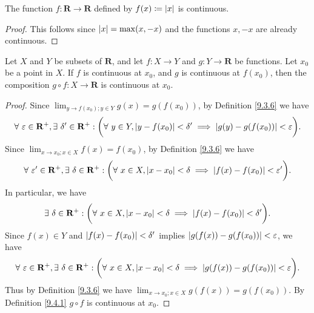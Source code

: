 \begin{proposition}\label{9.4.12}
    The function \(f : \mathbf{R} \to \mathbf{R}\) defined by \(f(x) \coloneqq \abs*{x}\) is continuous.
\end{proposition}

\begin{proof}
    This follows since \(\abs*{x} = \max(x, -x)\) and the functions \(x, -x\) are already continuous.
\end{proof}

\begin{proposition}\label{9.4.13}
    Let \(X\) and \(Y\) be subsets of \(\mathbf{R}\), and let \(f : X \to Y\) and \(g : Y \to \mathbf{R}\) be functions.
    Let \(x_0\) be a point in \(X\).
    If \(f\) is continuous at \(x_0\), and \(g\) is continuous at \(f(x_0)\), then the composition \(g \circ f : X \to \mathbf{R}\) is continuous at \(x_0\).
\end{proposition}

\begin{proof}
    Since \(\lim_{y \to f(x_0) ; y \in Y} g(x) = g(f(x_0))\), by Definition \ref{9.3.6} we have
    \[
        \forall\ \varepsilon \in \mathbf{R}^+, \exists\ \delta' \in \mathbf{R}^+ : \bigg(\forall\ y \in Y, \abs*{y - f(x_0)} < \delta' \implies \abs*{g(y) - g(f(x_0))} < \varepsilon\bigg).
    \]
    Since \(\lim_{x \to x_0 ; x \in X} f(x) = f(x_0)\), by Definition \ref{9.3.6} we have
    \[
        \forall\ \varepsilon' \in \mathbf{R}^+, \exists\ \delta \in \mathbf{R}^+ : \bigg(\forall\ x \in X, \abs*{x - x_0} < \delta \implies \abs*{f(x) - f(x_0)} < \varepsilon'\bigg).
    \]
    In particular, we have
    \[
        \exists\ \delta \in \mathbf{R}^+ : \bigg(\forall\ x \in X, \abs*{x - x_0} < \delta \implies \abs*{f(x) - f(x_0)} < \delta'\bigg).
    \]
    Since \(f(x) \in Y\) and \(\abs*{f(x) - f(x_0)} < \delta'\) implies \(\abs*{g(f(x)) - g(f(x_0))} < \varepsilon\), we have
    \[
        \forall\ \varepsilon \in \mathbf{R}^+, \exists\ \delta \in \mathbf{R}^+ : \bigg(\forall\ x \in X, \abs*{x - x_0} < \delta \implies \abs*{g(f(x)) - g(f(x_0))} < \varepsilon\bigg).
    \]
    Thus by Definition \ref{9.3.6} we have \(\lim_{x \to x_0 ; x \in X} g(f(x)) = g(f(x_0))\).
    By Definition \ref{9.4.1} \(g \circ f\) is continuous at \(x_0\).
\end{proof}

\exercisesection

\begin{exercise}\label{ex 9.4.2}

\end{exercise}